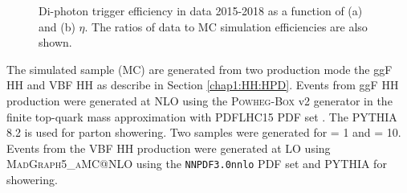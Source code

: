 \begin{figure}[htbp]
    \centering
    \caption{Di-photon trigger efficiency in data 2015-2018 as a function of (a) \eT and (b) $\eta$. The ratios of data to MC simulation efficiencies are also shown.}
    \label{fig:HHyybb:Data&MC:Trig}
\end{figure}
The simulated \HHyybb sample (MC) are generated from two production mode the ggF HH and VBF HH as describe in Section \ref{chap1:HH:HPD}. Events from ggF HH production were generated at NLO using the \textsc{Powheg-Box} v2 generator in the finite top-quark mass approximation with PDFLHC15 PDF set \cite{HH_FT, HH_Powheg, PDF4LHC}. The \textsc{PYTHIA} 8.2 is used for parton showering. Two samples were generated for \kl= 1 and \kl= 10. Events from the VBF HH production were generated at LO  using \textsc{MadGraph5\_aMC@NLO} \cite{HH_VBF} using the \texttt{NNPDF3.0nnlo} PDF set \cite{VBF_PDF} and \textsc{PYTHIA} for showering. \\


